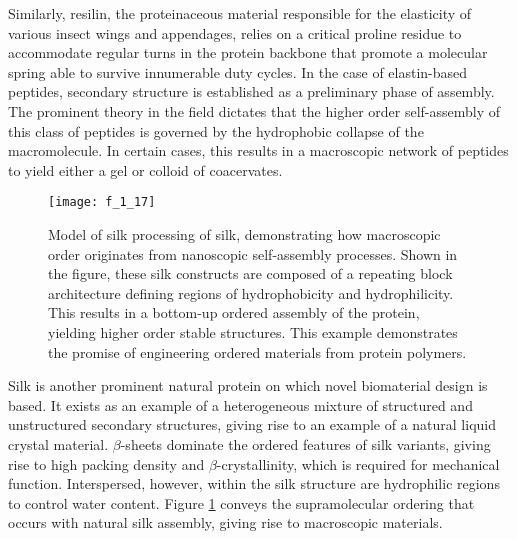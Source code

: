 \begin{refsection}
Similarly, resilin, the proteinaceous material responsible for the elasticity of
various insect wings and appendages, relies on a critical proline residue to
accommodate regular turns in the protein backbone that promote a molecular
spring able to survive innumerable duty cycles.\cite{Rauscher2006} In the case
of elastin-based peptides, secondary structure is established as a preliminary
phase of assembly. The prominent theory in the field dictates that the higher
order self-assembly of this class of peptides is governed by the hydrophobic
collapse of the macromolecule. In certain cases, this results in a macroscopic
network of peptides to yield either a gel or colloid of
coacervates.\cite{Urry1991,Li2002a,Li2001,Urry1986,Urry1988}
\begin{figure}[h!] \centering \texttt{[image: f\_1\_17]}
    \caption[Model of silk processing of  silk, demonstrating how
        macroscopic order originates from nanoscopic self-assembly processes.
        Shown in the figure, these silk constructs are composed of a repeating
        block architecture defining regions of hydrophobicity and
    hydrophilicity. This results in a bottom-up ordered assembly of the protein,
yielding higher order stable structures. This example demonstrates the promise
of engineering ordered materials from protein polymers.]{Model of silk
    processing of  silk, demonstrating how macroscopic order
    originates from nanoscopic self-assembly processes. Shown in the figure,
    these silk constructs are composed of a repeating block architecture
    defining regions of hydrophobicity and hydrophilicity. This results in a
    bottom-up ordered assembly of the protein, yielding higher order stable
    structures. This example demonstrates the promise of engineering ordered
    materials from protein polymers.\cite{Jin2003}}\label{fig:silk_structure}
\end{figure}
Silk is another prominent natural protein on which novel biomaterial design is
based. It exists as an example of a heterogeneous mixture of structured and
unstructured secondary structures, giving rise to an example of a natural liquid
crystal material. $\beta$-sheets dominate the ordered features of silk variants,
giving rise to high packing density and ${\beta}$-crystallinity, which is
required for mechanical function. Interspersed, however, within the silk
structure are hydrophilic regions to control water
content.\cite{Bini2004a,Jin2003,Knight2002} Figure \ref{fig:silk_structure}
conveys the supramolecular ordering that occurs with natural silk assembly,
giving rise to macroscopic materials.


\end{refsection}
